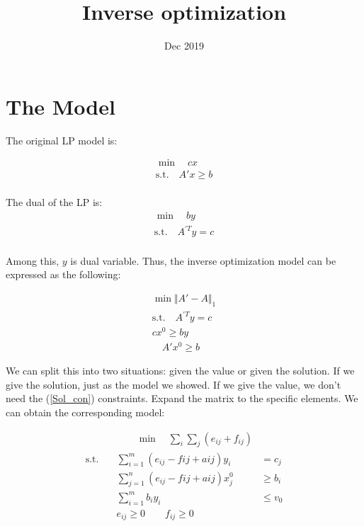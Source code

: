 \documentclass[UTF8]{article}
\title{Inverse optimization}
\date{Dec 2019}
\numberwithin{equation}{section}
\begin{document}
\maketitle{}

\section{The Model}

The original LP model is:

\begin{align*}
  \min \quad cx \\
\text{s.t.} \quad A'x \geq b  \\
\end{align*}

The dual of the LP is:
\begin{align*}
  \min \quad by \\
\text{s.t.} \quad A^{'T}y = c  \\
\end{align*}

Among this, $y$ is dual variable.
Thus, the inverse optimization model can be expressed as the following:

\begin{align}
  \min \Vert A'-A \Vert_1 \nonumber \\
\mathrm{s.t.}  \quad A^{'T}y = c  \\
  cx^0 \geq by  \\
  \quad A'x^0 \geq b \label{Sol_con}
\end{align}

We can split this into two situations: given the value or given the solution. If we give the solution, just as the model we showed. If we give the value, we don't need the (\ref{Sol_con}) constraints.
Expand the matrix to the specific elements. We can obtain the corresponding model:

\begin{equation}
\begin{align*}
&\qquad \min \quad \sum_i \sum_j (e_{ij}+f_{ij})\\
\mathrm{s.t.} \quad &\sum_{i=1}^m (e_{ij}-f{ij}+a{ij})y_i & = c_j \\
&\sum_{j=1}^n (e_{ij}-f{ij}+a{ij})x_j^0 & \geq b_i \\
&\sum_{i=1}^m b_i y_i & \leq v_0 \\
&e_{ij} \geq 0 \qquad f_{ij} \geq 0
\end{align*}
\end{equation}
\end{document}
